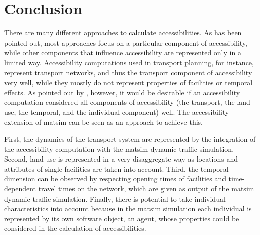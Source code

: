 \section{Conclusion}
There are many different approaches to calculate accessibilities. As has been pointed out, most approaches focus
on a particular component of accessibility, while other components that influence accessibility are 
represented only in a limited way. Accessibility computations used in transport planning, for instance, represent 
transport networks, and thus the transport component of accessibility very well, while they mostly do not represent
properties of facilities or temporal effects. As pointed out by \citet{Geurs2004AccessibilityReview}, however, it
would be desirable if an accessibility computation considered all components of accessibility (\ie the transport, 
the land-use, the temporal, and the individual component) well. The accessibility extension of \gls{matsim} can 
be seen as an approach to achieve this. 

First, the dynamics of the transport system are represented by the integration of the accessibility 
computation with the \gls{matsim} dynamic traffic simulation. Second, land use is represented in a very
disaggregate way as locations and attributes of single facilities are taken into account.
Third, the temporal dimension can be observed by respecting opening times of facilities and time-dependent
travel times on the network, which are given as output of the \gls{matsim} dynamic traffic simulation.
Finally, there is potential to take individual characteristics into account because in the \gls{matsim}
simulation each individual is represented by its own software object, \ie an agent, whose properties could be
considered in the calculation of accessibilities.

